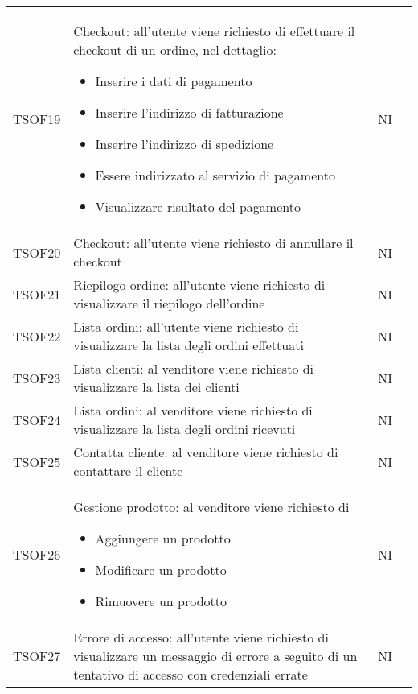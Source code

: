 \begin{center}
\begin{longtable}[!h]{p{50px} p{245px} p{75px} p{50px}}
        TSOF19  & Checkout: all'utente viene richiesto di effettuare il checkout di un ordine, nel dettaglio: \begin{itemize} \item Inserire i dati di pagamento \item Inserire l'indirizzo di fatturazione \item Inserire l'indirizzo di spedizione \item Essere indirizzato al servizio di pagamento \item Visualizzare risultato del pagamento \end{itemize} & NI \\
        TSOF20  & Checkout: all'utente viene richiesto di annullare il checkout & NI \\
        TSOF21  & Riepilogo ordine: all'utente viene richiesto di visualizzare il riepilogo dell'ordine & NI \\
        TSOF22  & Lista ordini: all'utente viene richiesto di visualizzare la lista degli ordini effettuati  & NI \\
        TSOF23  & Lista clienti: al venditore viene richiesto di visualizzare la lista dei clienti & NI \\
        TSOF24  & Lista ordini: al venditore viene richiesto di visualizzare la lista degli ordini ricevuti & NI \\
        TSOF25  & Contatta cliente: al venditore viene richiesto di contattare il cliente & NI \\
        TSOF26  & Gestione prodotto: al venditore viene richiesto di \begin{itemize} \item Aggiungere un prodotto \item Modificare un prodotto \item Rimuovere un prodotto \end{itemize} & NI \\
        TSOF27  & Errore di accesso: all'utente viene richiesto di visualizzare un messaggio di errore a seguito di un tentativo di accesso con credenziali errate & NI \\
    \end{longtable}    
\end{center}
